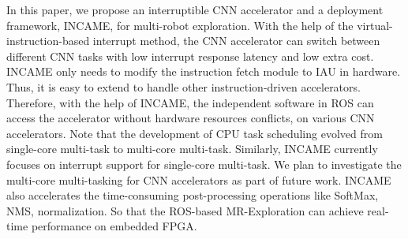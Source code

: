 \label{sec:conclusion}

In this paper, we propose an interruptible CNN accelerator and a deployment framework, INCAME, for multi-robot exploration. 
With the help of the virtual-instruction-based interrupt method, the CNN accelerator can switch between different CNN tasks with low interrupt response latency and low extra cost. 
INCAME only needs to modify the instruction fetch module to IAU in hardware. Thus, it is easy to extend to handle other instruction-driven accelerators.
Therefore, with the help of INCAME, the independent software in ROS can access the accelerator without hardware resources conflicts, on various CNN accelerators.
Note that the development of CPU task scheduling evolved from single-core multi-task to multi-core multi-task. Similarly, INCAME currently focuses on interrupt support for single-core multi-task. We plan to investigate the multi-core multi-tasking for CNN accelerators as part of future work.
INCAME also accelerates the time-consuming post-processing operations like SoftMax, NMS, normalization.
So that the ROS-based MR-Exploration can achieve real-time performance on embedded FPGA. 

